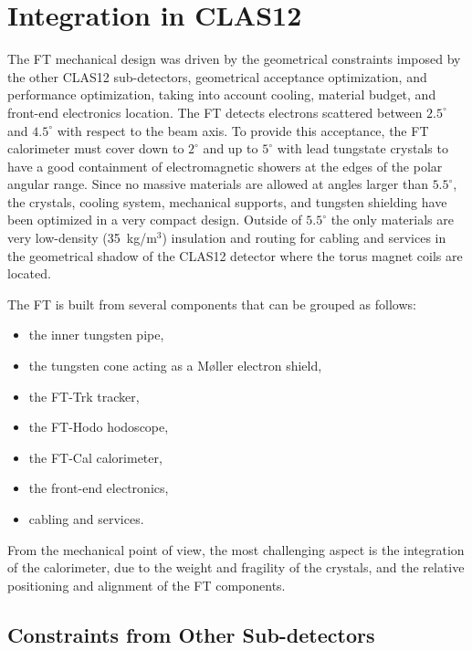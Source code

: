 \section{Integration in CLAS12}
\label{sec:integration}

The FT mechanical design was driven by the geometrical constraints imposed by the other CLAS12 sub-detectors,
geometrical acceptance optimization, and performance optimization, taking into account cooling, material budget, and
front-end electronics location. The FT detects electrons scattered between $2.5^\circ$ and $4.5^\circ$ with respect
to the beam axis. To provide this acceptance, the FT calorimeter must cover down to $2^\circ$ and up to $5^\circ$ with
lead tungstate crystals to have a good containment of electromagnetic showers at the edges of the polar angular range.
Since no massive materials are allowed at angles larger than $5.5^\circ$, the crystals, cooling system, mechanical
supports, and tungsten shielding have been optimized in a very compact design. Outside of $5.5^\circ$ the only
materials are very low-density (35~kg/m$^3$) insulation and routing for cabling and services in the geometrical shadow of the
CLAS12 detector where the torus magnet coils are located.

The FT is built from several components that can be grouped as follows:

\begin{itemize}
\item{the inner tungsten pipe,}
\item{the tungsten cone acting as a M{\o}ller electron shield,}
\item{the FT-Trk tracker,}
\item{the FT-Hodo hodoscope,}
\item{the FT-Cal calorimeter,}
\item{the front-end electronics,}
\item{cabling and services.}
\end{itemize}

From the mechanical point of view, the most challenging aspect is the integration of the calorimeter, due to the
weight and fragility of the crystals, and the relative positioning and alignment of the FT components.

\subsection{Constraints from Other Sub-detectors}

